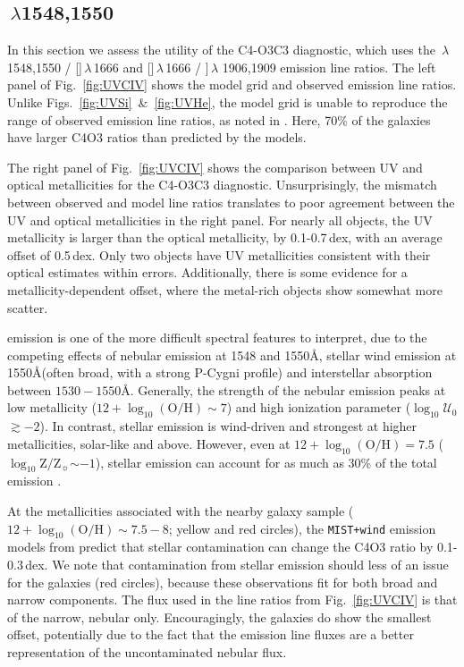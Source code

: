 \documentclass[trackchanges, preprint2]{aastex62}
\newcommand{\oiii}{[\ion{O}{3}]}
\newcommand{\civ}{\ion{C}{4}}
\newcommand{\ciii}{\ion{C}{3}]}
\newcommand{\logten}{\ensuremath{\log_{10}}}
\newcommand{\logZ}{\ensuremath{\logten \mathrm{Z}/\mathrm{Z}_{\sun}}\xspace}
\newcommand{\logOH}{\ensuremath{\logten (\mathrm{O}/\mathrm{H})}\xspace}
\newcommand{\ang}{\ensuremath{\mbox{\AA}}\xspace}
\newcommand{\logU}{\ensuremath{\logten \mathcal{U}_0}}
\begin{document}
\subsection{\civ$\,\lambda$1548,1550}\label{sec:ZZ:CIV}

In this section we assess the utility of the C4-O3C3 diagnostic, which uses the \civ$\,\lambda$ 1548,1550 / \oiii $\,\lambda$\,1666 and \oiii $\,\lambda$\,1666 / \ciii $\,\lambda$ 1906,1909 emission line ratios. The left panel of Fig.~\ref{fig:UVCIV} shows the model grid and observed emission line ratios. Unlike Figs.~\ref{fig:UVSi}~\&~\ref{fig:UVHe}, the model grid is unable to reproduce the range of observed emission line ratios, as noted in . Here, 70\% of the galaxies have larger C4O3 ratios than predicted by the models.

The right panel of Fig.~\ref{fig:UVCIV} shows the comparison between UV and optical metallicities for the C4-O3C3 diagnostic. Unsurprisingly, the mismatch between observed and model line ratios translates to poor agreement between the UV and optical metallicities in the right panel. For nearly all objects, the UV metallicity is larger than the optical metallicity, by 0.1-0.7\,dex, with an average offset of 0.5\,dex. Only two objects have UV metallicities consistent with their optical estimates within errors. Additionally, there is some evidence for a metallicity-dependent offset, where the metal-rich objects show somewhat more scatter.

 emission is one of the more difficult spectral features to interpret, due to the competing effects of nebular emission at 1548 and 1550\ang, stellar wind emission at 1550\ang (often broad, with a strong P-Cygni profile) and interstellar absorption between $1530-1550$\ang. Generally, the strength of the nebular  emission peaks at low metallicity ($12+\logOH \sim 7$) and high ionization parameter (\logU$\gtrsim-2$). In contrast, stellar emission is wind-driven and strongest at higher metallicities, solar-like and above. However, even at $12+\logOH = 7.5$ (\logZ${\sim}-1$), stellar  emission can account for as much as 30\% of the total  emission .

At the metallicities associated with the nearby galaxy sample ($12+\logOH \sim 7.5-8$; yellow and red circles), the {\tt MIST+wind}  emission models from  predict that stellar contamination can change the C4O3 ratio by 0.1-0.3\,dex. We note that contamination from stellar emission should less of an issue for the \citet{Senchyna+2017} galaxies (red circles), because these observations fit for both broad and narrow  components. The  flux used in the line ratios from Fig.~\ref{fig:UVCIV} is that of the narrow, nebular  only. Encouragingly, the \citet{Senchyna+2017} galaxies do show the smallest offset, potentially due to the fact that the  emission line fluxes are a better representation of the uncontaminated nebular flux.
\end{document}
